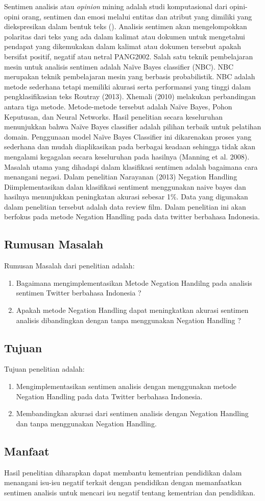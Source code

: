 Sentimen analisis atau \textit{opinion} mining adalah studi komputasional dari opini-opini orang, sentimen dan emosi melalui entitas dan atribut yang dimiliki yang diekspresikan dalam bentuk teks \citeauthor{LIU2012} (\cite*{LIU2012}). Analisis sentimen akan mengelompokkan polaritas dari teks yang ada dalam kalimat atau dokumen untuk mengetahui pendapat yang dikemukakan dalam kalimat atau dokumen tersebut apakah bersifat positif, negatif atau netral PANG2002. Salah satu teknik pembelajaran mesin untuk analisis sentimen adalah Naïve Bayes classifier (NBC). NBC merupakan teknik pembelajaran mesin yang berbasis probabilistik. NBC adalah metode sederhana tetapi memiliki akurasi serta performansi yang tinggi dalam pengklasifikasian teks Routray (2013). Xhemali (2010) melakukan perbandingan antara tiga metode. Metode-metode tersebut adalah Naïve Bayes, Pohon Keputusan, dan Neural Networks. Hasil penelitian secara keseluruhan menunjukkan bahwa Naïve Bayes classifier adalah pilihan terbaik untuk pelatihan domain. Penggunaan model Naïve Bayes Classifier ini dikarenakan proses yang sederhana dan mudah diaplikasikan pada berbagai keadaan sehingga tidak akan mengalami kegagalan secara keseluruhan pada hasilnya (Manning et al. 2008).
Masalah utama yang dihadapi dalam klasifikasi sentimen adalah bagaimana cara menangani negasi. Dalam penelitian Narayanan (2013) Negation Handling Diimplementasikan dalan klasifikasi sentiment menggunakan naive bayes dan hasilnya menunjukkan peningkatan akurasi sebesar 1\%. Data yang digunakan dalam penelitian tersebut adalah data review film. Dalam penelitian ini akan berfokus pada metode Negation Handling pada data twitter berbahasa Indonesia.



\subsection*{Rumusan Masalah}
Rumusan Masalah dari penelitian adalah:
\begin{enumerate}[noitemsep] 
	\item Bagaimana mengimplementasikan Metode Negation Handilng pada analisis sentimen Twitter berbahasa Indonesia ?
	\item Apakah metode Negation Handling dapat meningkatkan akurasi sentimen analisis dibandingkan dengan tanpa menggunakan Negation Handling ?
\end{enumerate}

\subsection*{Tujuan}
Tujuan penelitian adalah:
\begin{enumerate}[noitemsep] 
	\item Mengimplementasikan sentimen analisis dengan menggunakan metode Negation Handling pada data Twitter berbahasa Indonesia.
	\item Membandingkan akurasi dari sentimen analisis dengan Negation Handling dan tanpa menggunakan Negation Handling.
\end{enumerate}

\subsection*{Manfaat}
Hasil penelitian diharapkan dapat membantu kementrian pendidikan dalam menangani isu-isu negatif terkait dengan pendidikan dengan memanfaatkan sentimen analisis untuk mencari isu negatif tentang kementrian dan pendidikan.
